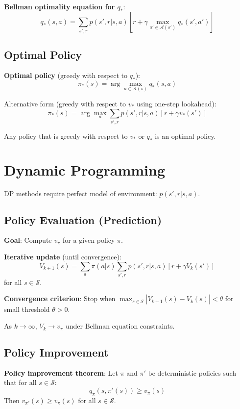\documentclass[10pt]{article}
\begin{document}
\textbf{Bellman optimality equation for $q_*$}:
\begin{equation}
q_*(s,a) = \sum_{s',r} p(s',r|s,a)\left[r + \gamma \max_{a' \in \mathcal{A}(s')} q_*(s',a')\right]
\end{equation}

\subsection{Optimal Policy}

\textbf{Optimal policy} (greedy with respect to $q_*$):
\begin{equation}
\pi_*(s) = \arg\max_{a \in \mathcal{A}(s)} q_*(s,a)
\end{equation}

Alternative form (greedy with respect to $v_*$ using one-step lookahead):
\begin{equation}
\pi_*(s) = \arg\max_{a} \sum_{s',r} p(s',r|s,a)\left[r + \gamma v_*(s')\right]
\end{equation}

Any policy that is greedy with respect to $v_*$ or $q_*$ is an optimal policy.

\section{Dynamic Programming}

DP methods require perfect model of environment: $p(s',r|s,a)$.

\subsection{Policy Evaluation (Prediction)}

\textbf{Goal}: Compute $v_\pi$ for a given policy $\pi$.

\textbf{Iterative update} (until convergence):
\begin{equation}
V_{k+1}(s) = \sum_{a} \pi(a|s) \sum_{s',r} p(s',r|s,a)\left[r + \gamma V_k(s')\right]
\end{equation}
for all $s \in \mathcal{S}$.

\textbf{Convergence criterion}: Stop when $\max_{s \in \mathcal{S}} |V_{k+1}(s) - V_k(s)| < \theta$ for small threshold $\theta > 0$.

As $k \to \infty$, $V_k \to v_\pi$ under Bellman equation constraints.

\subsection{Policy Improvement}

\textbf{Policy improvement theorem}: Let $\pi$ and $\pi'$ be deterministic policies such that for all $s \in \mathcal{S}$:
\begin{equation}
q_\pi(s, \pi'(s)) \geq v_\pi(s)
\end{equation}
Then $v_{\pi'}(s) \geq v_\pi(s)$ for all $s \in \mathcal{S}$.
\end{document}
